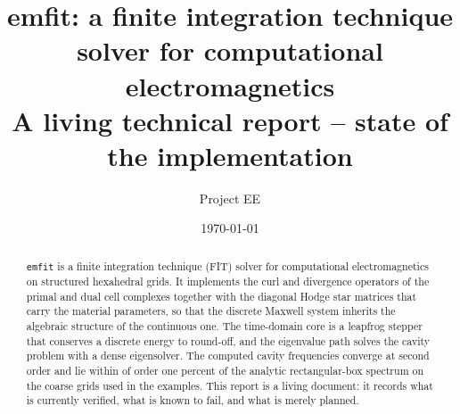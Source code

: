 \documentclass[11pt,a4paper]{article}
\title{emfit: a finite integration technique solver for computational electromagnetics\\
  \large A living technical report -- state of the implementation}
\author{Project EE}
\date{\today}
\begin{document}
\maketitle

\begin{abstract}
\noindent
\texttt{emfit} is a finite integration technique (FIT) solver for computational electromagnetics on structured
hexahedral grids. It implements the curl and divergence operators of the primal and dual cell complexes together
with the diagonal Hodge star matrices that carry the material parameters, so that the discrete Maxwell system
inherits the algebraic structure of the continuous one. The time-domain core is a leapfrog stepper that conserves
a discrete energy to round-off, and the eigenvalue path solves the cavity problem with a dense eigensolver. The
computed cavity frequencies converge at second order and lie within of order one percent of the analytic
rectangular-box spectrum on the coarse grids used in the examples. This report is a living document: it records
what is currently verified, what is known to fail, and what is merely planned.
\end{abstract}

\tableofcontents

\clearpage

\end{document}
